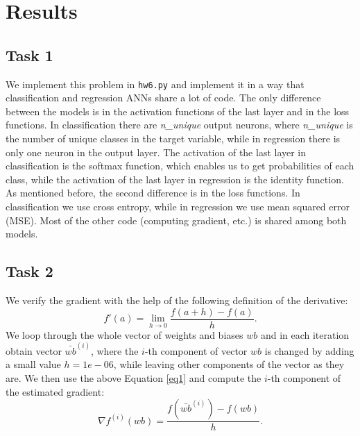 \documentclass[fleqn,moreauthors,10pt]{ds_report}
\affiliation{\textit{}}
\begin{document}
\flushbottom 

\maketitle 

\thispagestyle{empty} 


\section*{Results}
\subsection*{Task 1}
We implement this problem in \texttt{hw6.py} and implement it in a way that classification and regression ANNs share a lot of code. The only difference between the models is in the activation functions of the last layer and in the loss functions. In classification there are \textit{n\_unique} output neurons, where \textit{n\_unique} is the number of unique classes in the target variable, while in regression there is only one neuron in the output layer. The activation of the last layer in classification is the softmax function, which enables us to get probabilities of each class, while the activation of the last layer in regression is the identity function. As mentioned before, the second difference is in the loss functions. In classification we use cross entropy, while in regression we use mean squared error (MSE). Most of the other code (computing gradient, etc.) is shared among both models.

\subsection*{Task 2}
We verify the gradient with the help of the following definition of the derivative:
\begin{equation}
\label{eq1}
f'(a) = \lim_{h \rightarrow 0} \frac{f(a+h) - f(a)}{h}.
\end{equation}
We loop through the whole vector of weights and biases $wb$ and in each iteration obtain vector $\bar{wb}^{(i)}$, where the $i$-th component of vector $wb$ is changed by adding a small value $h = 1e-06$, while leaving other components of the vector as they are. We then use the above Equation \ref{eq1} and compute the $i$-th component of the estimated gradient:
\begin{equation}
\nabla f^{(i)}(wb) = \frac{f(\bar{wb}^{(i)})-f(wb)}{h}.
\end{equation}
\end{document}
